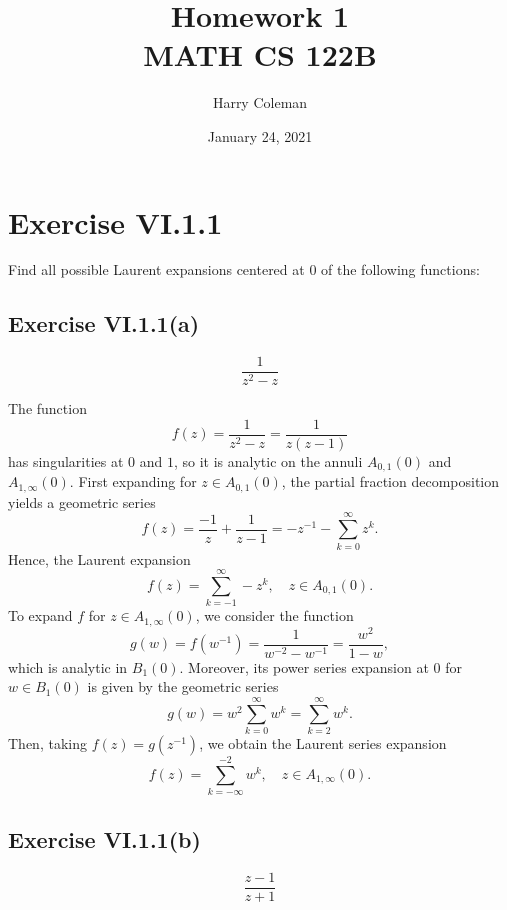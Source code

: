 \documentclass[12pt]{article}
\title{Homework 1\\
    \large MATH CS 122B
}
\author{Harry Coleman}
\date{January 24, 2021}
\newenvironment{problem}
    {\begin{lrbox}{\mybox}\begin{minipage}{0.98\textwidth}}
    {\end{minipage}\end{lrbox}\begin{center}\framebox[\textwidth]{\usebox{\mybox}}\end{center}}
\theoremstyle{definition}
\begin{document}
\maketitle

\section{Exercise VI.1.1}
\begin{problem}
    Find all possible Laurent expansions centered at $0$ of the following functions:
\end{problem}

\subsection{Exercise VI.1.1(a)}
\begin{problem}
    \[
        \frac{1}{z^2 - z}
    \]
\end{problem}

The function
\[
    f(z) = \frac{1}{z^2 - z} = \frac{1}{z(z - 1)}
\]
has singularities at $0$ and $1$, so it is analytic on the annuli $A_{0,1}(0)$ and $A_{1,\infty}(0)$. First expanding for $z \in A_{0,1}(0)$, the partial fraction decomposition yields a geometric series
\[
    f(z) = \frac{-1}{z} + \frac{1}{z - 1} = -z^{-1} - \sum_{k=0}^\infty z^k.
\]
Hence, the Laurent expansion
\[
    f(z) = \sum_{k=-1}^\infty -z^k, \quad z \in A_{0,1}(0).
\]
To expand $f$ for $z \in A_{1,\infty}(0)$, we consider the function
\[
    g(w) = f(w^{-1}) = \frac{1}{w^{-2} - w^{-1}} = \frac{w^2}{1 - w},
\]
which is analytic in $B_1(0)$. Moreover, its power series expansion at $0$ for $w \in B_1(0)$ is given by the geometric series
\[
    g(w) = w^2\sum_{k=0}^\infty w^k = \sum_{k=2}^\infty w^k.
\]
Then, taking $f(z) = g(z^{-1})$, we obtain the Laurent series expansion
\[
    f(z) = \sum_{k=-\infty}^{-2} w^k, \quad z \in A_{1,\infty}(0).
\]

\subsection{Exercise VI.1.1(b)}
\begin{problem}
    \[
        \frac{z - 1}{z + 1}
    \]
\end{problem}
\end{document}
